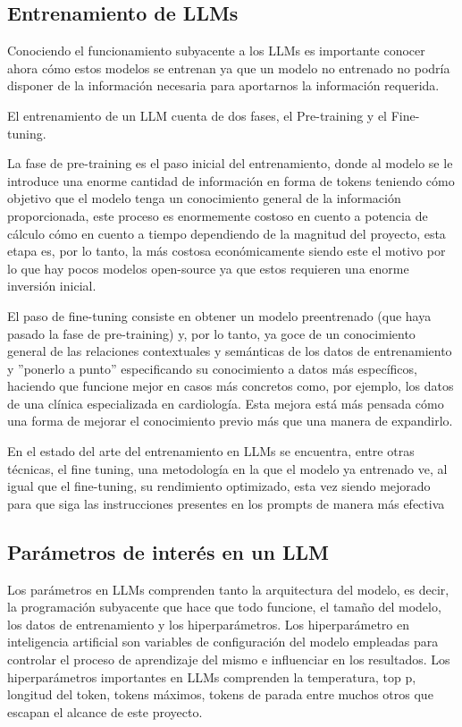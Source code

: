 \subsection{Entrenamiento de LLMs}

Conociendo el funcionamiento subyacente a los LLMs es importante conocer ahora cómo estos modelos se entrenan ya que un modelo no entrenado no podría disponer de la información necesaria para aportarnos la información requerida.

El entrenamiento de un LLM cuenta de dos fases, el Pre-training y el Fine-tuning.

La fase de  pre-training es el paso inicial del entrenamiento, donde al modelo se le introduce una enorme cantidad de información en forma de tokens teniendo cómo objetivo que el modelo tenga un conocimiento general de la información proporcionada, este proceso es enormemente costoso en cuento a potencia de cálculo cómo en cuento a tiempo dependiendo de la magnitud del proyecto, esta etapa es, por lo tanto, la más costosa económicamente siendo este el motivo por lo que hay pocos modelos open-source ya que estos requieren una enorme inversión inicial.

El paso de fine-tuning consiste en obtener un modelo preentrenado (que haya pasado la fase de pre-training) y, por lo tanto, ya goce de un conocimiento general de las relaciones contextuales y semánticas de los datos de entrenamiento y ''ponerlo a punto'' especificando su conocimiento a datos más específicos, haciendo que funcione mejor en casos más concretos como, por ejemplo, los datos de una clínica especializada en cardiología. Esta mejora está más pensada cómo una forma de mejorar el conocimiento previo más que una manera de expandirlo.

En el estado del arte del entrenamiento en LLMs se encuentra, entre otras técnicas, el fine tuning, una metodología en la que el modelo ya entrenado ve, al igual que el fine-tuning, su rendimiento optimizado, esta vez siendo mejorado para que siga las instrucciones presentes en los prompts de manera más efectiva

\subsection{Parámetros de interés en un LLM}

Los parámetros en LLMs comprenden tanto la arquitectura del modelo, es decir, la programación subyacente que hace que todo funcione, el tamaño del modelo, los datos de entrenamiento y los hiperparámetros.
Los hiperparámetro en inteligencia artificial son variables de configuración del modelo empleadas para controlar el proceso de aprendizaje del mismo e influenciar en los resultados.
Los hiperparámetros importantes en LLMs comprenden la temperatura, top p, longitud del token, tokens máximos, tokens de parada entre muchos otros que escapan el alcance de este proyecto.

